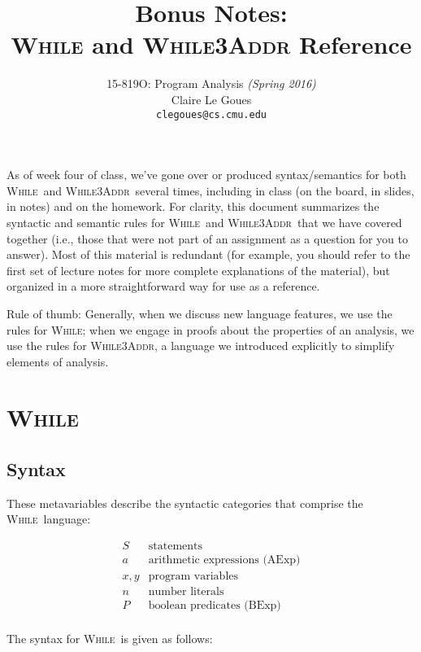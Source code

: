 \documentclass[11pt]{article}
\title{Bonus Notes:\\
\textsc{While} and \textsc{While3Addr} Reference}
\author{15-819O: Program Analysis \emph{(Spring 2016)} \\
        Claire Le Goues \\
		{\tt clegoues@cs.cmu.edu}}
\date{}
\def\While{\textsc{While}}
\def\WhileThAddr{\textsc{While3Addr}}
\begin{document}
\newtheorem{theorem}{Theorem}
\newtheorem{lemma}[theorem]{Lemma}

\maketitle

As of week four of class, we've gone over or produced syntax/semantics for both \While\ and \WhileThAddr\ several times, including in class (on the board, in slides, in notes) and on the homework.  For clarity, this document summarizes the syntactic and semantic rules for \While\ and \WhileThAddr\ that we have covered together (i.e., those that were not part of an assignment as a question for you to answer).  Most of this material is redundant (for example, you should refer to the first set of lecture notes for more complete explanations of the material),  but organized in a more straightforward way for use as a reference.  

Rule of thumb: Generally, when we discuss new language features, we use the rules for \While; when we engage in proofs about the properties of an analysis, we use the rules for \WhileThAddr, a language we introduced explicitly to simplify elements of analysis. 

\section{\While}

\subsection{Syntax}  

\noindent These metavariables describe the syntactic categories that comprise the \While\ language:

\[
\begin{array}{ll}
S   & \mbox{statements}\\
a   & \mbox{arithmetic expressions (AExp)}\\
x,y & \mbox{program variables}\\
n   & \mbox{number literals}\\
P   & \mbox{boolean predicates (BExp)}\\
\end{array}
\]

\noindent The syntax for \While\ is given as follows:
\end{document}
